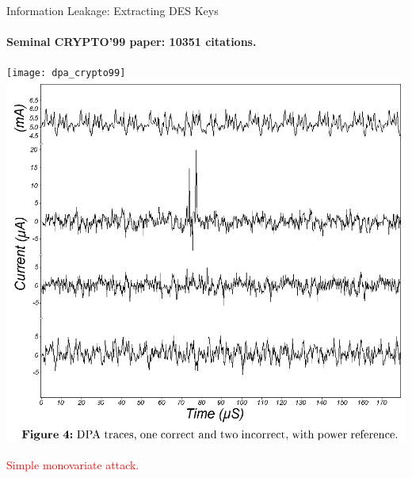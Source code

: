 \documentclass{beamer}
\begin{document}
% 

\begin{frame}{Information Leakage: \dotfill Extracting DES Keys}
	\framesubtitle{\hfill Seminal CRYPTO'99 paper: 10351 citations.}
	\begin{center}
		\texttt{[image: dpa\_crypto99]} \ %
		\includegraphics[height=.35\linewidth]{DPA_fig4.png}
	\end{center}
\begin{center}
\textcolor{red}{Simple monovariate attack.}
\end{center}
	
\end{frame}
\end{document}
